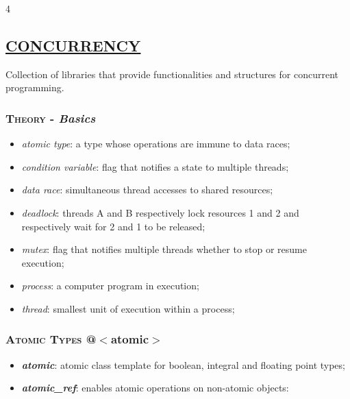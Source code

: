 \documentclass[10pt]{article}
\newcommand{\softseparator}{%
  \par\noindent{\color{RuleGray}\rule{\linewidth}{0.35pt}}\vspace{1pt}
}
\begin{document}
\begin{multicols*}{4}
{}

\softseparator

{\color{Blue}
\subsection*{\href{https://en.cppreference.com/w/cpp/thread}{\underline{CONCURRENCY}}}	
\noindent
Collection of libraries that provide functionalities and structures for concurrent programming.

\subsubsection*{\textsc{Theory} - \emph{Basics}} 
\begin{itemize}[leftmargin=*,topsep=0.25pt]
  \setlength\itemsep{-1.8pt}
	\item  \emph{atomic type}: a type whose operations are immune to data races;
	\item  \emph{condition variable}: flag that notifies a state to multiple threads;  
	\item  \emph{data race}: simultaneous thread accesses to shared resources;
	\item  \emph{deadlock}: threads A and B respectively lock resources 1 and 2 and respectively wait for 2 and 1 to be released;
	\item  \emph{mutex}: flag that notifies multiple threads whether to stop or resume execution; 
	\item  \emph{process}: a computer program in execution;
	\item  \emph{thread}: smallest unit of execution within a process;
\end{itemize}

\subsubsection*{\textsc{Atomic Types} @$<$atomic$>$} 
\begin{itemize}[leftmargin=*,topsep=0.25pt]
  \setlength\itemsep{-1.8pt}
	\item  \emph{\textbf{atomic}}: atomic class template for boolean, integral and floating point types;
	\item  \emph{\textbf{atomic\_ref}}: enables atomic operations on non-atomic objects: 
\end{itemize}

}
\end{multicols*}
\end{document}
